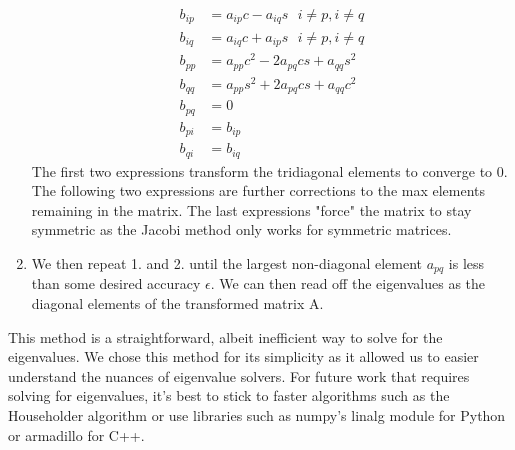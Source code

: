 \documentclass{article}
\begin{document}
\begin{enumerate}
\begin{align*}
	b_{ip} &= a_{ip}c - a_{iq}s \ \ \ i \neq p, i \neq q\\
    b_{iq} &= a_{iq}c + a_{ip}s \ \ \ i \neq p, i \neq q \\
    b_{pp} &= a_{pp}c^{2} - 2a_{pq}cs + a_{qq}s^{2}\\ 
    b_{qq} &= a_{pp}s^{2} + 2a_{pq}cs + a_{qq}c^{2}\\
    b_{pq} &= 0\\
    b_{pi} &= b_{ip}\\
    b_{qi} &= b_{iq}
\end{align*}
	The first two expressions transform the tridiagonal elements to converge to 0. The following two expressions are further corrections to the max elements remaining in the matrix. The last expressions "force" the matrix to stay symmetric as the Jacobi method only works for symmetric matrices.
    \item We then repeat 1. and 2. until the largest non-diagonal element $a_{pq}$ is less than some desired accuracy $\epsilon$. We can then read off the eigenvalues as the diagonal elements of the transformed matrix A. 
    

\end{enumerate}
	This method is a straightforward, albeit inefficient way to solve for the eigenvalues. We chose this method for its simplicity as it allowed us to easier understand the nuances of eigenvalue solvers. For future work that requires solving for eigenvalues, it's best to stick to faster algorithms such as the Householder algorithm or use libraries such as numpy's linalg module for Python or armadillo for C++.
    
\end{document}
